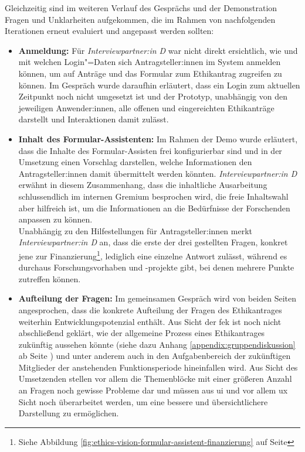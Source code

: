 \documentclass[a4paper,12pt,twoside]{scrreprt}
\begin{document}
Gleichzeitig sind im weiteren Verlauf des Gesprächs und der Demonstration Fragen und Unklarheiten aufgekommen, die im Rahmen von nachfolgenden Iterationen erneut evaluiert und angepasst werden sollten:
\begin{itemize}
    \item \textbf{Anmeldung:} Für \textit{Interviewpartner:in D} war nicht direkt ersichtlich, wie und mit welchen Login"=Daten sich Antragsteller:innen im System anmelden können, um auf Anträge und das Formular zum Ethikantrag zugreifen zu können. Im Gespräch wurde daraufhin erläutert, dass ein Login zum aktuellen Zeitpunkt noch nicht umgesetzt ist und der Prototyp, unabhängig von den jeweiligen Anwender:innen, alle offenen und eingereichten Ethikanträge darstellt und Interaktionen damit zulässt.
    \item \textbf{Inhalt des Formular-Assistenten:} Im Rahmen der Demo wurde erläutert, dass die Inhalte des Formular-Assisten frei konfigurierbar sind und in der Umsetzung einen Vorschlag darstellen, welche Informationen den Antragsteller:innen damit übermittelt werden könnten. \textit{Interviewpartner:in D} erwähnt in diesem Zusammenhang, dass die inhaltliche Ausarbeitung schlussendlich im internen Gremium besprochen wird, die freie Inhaltswahl aber hilfreich ist, um die Informationen an die Bedürfnisse der Forschenden anpassen zu können.\\
    Unabhängig zu den Hilfestellungen für Antragsteller:innen merkt \textit{Interviewpartner:in D} an, dass die erste der drei gestellten Fragen, konkret jene zur Finanzierung\footnote{Siehe Abbildung \ref{fig:ethics-vision-formular-assistent-finanzierung} auf Seite \pageref{fig:ethics-vision-formular-assistent-finanzierung}}, lediglich eine einzelne Antwort zulässt, während es durchaus Forschungsvorhaben und -projekte gibt, bei denen mehrere Punkte zutreffen können.
    \clearpage
    \item \textbf{Aufteilung der Fragen:} Im gemeinsamen Gespräch wird von beiden Seiten angesprochen, dass die konkrete Aufteilung der Fragen des Ethikantrages weiterhin Entwicklungspotenzial enthält. Aus Sicht der \ac{fek} ist noch nicht abschließend geklärt, wie der allgemeine Prozess eines Ethikantrages zukünftig aussehen könnte (siehe dazu Anhang \ref{appendix:gruppendiskussion} ab Seite \pageref{appendix:gruppendiskussion}) und unter anderem auch in den Aufgabenbereich der zukünftigen Mitglieder der anstehenden Funktionsperiode hineinfallen wird. Aus Sicht des Umsetzenden stellen vor allem die Themenblöcke mit einer größeren Anzahl an Fragen noch gewisse Probleme dar und müssen aus \ac{ui} und vor allem \ac{ux} Sicht noch überarbeitet werden, um eine bessere und übersichtlichere Darstellung zu ermöglichen.

\end{itemize}
\end{document}
